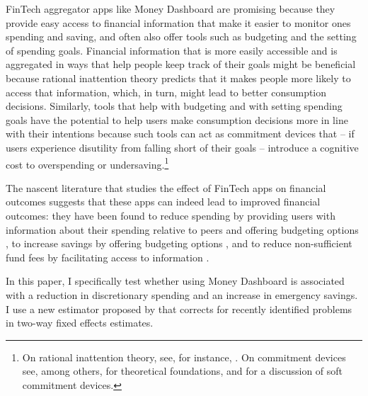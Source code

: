 FinTech aggregator apps like Money Dashboard are promising because they provide
easy access to financial information that make it easier to monitor ones
spending and saving, and often also offer tools such as budgeting and the
setting of spending goals. Financial information that
is more easily accessible and is aggregated in ways that help people keep track
of their goals might be beneficial because rational inattention theory predicts
that it makes people more likely to access that information, which, in turn,
might lead to better consumption decisions. Similarly, tools that help with
budgeting and with setting spending goals have the potential to help users make
consumption decisions more in line with their intentions because such tools can
act as commitment devices that -- if users experience disutility from falling
short of their goals -- introduce a cognitive cost to overspending or
undersaving.\footnote{On rational inattention theory, see, for instance,
    \citet{brunnermeier2008wealth, dellavigna2009psychology,
    sims2003implications}. On commitment devices see, among others,
    \citet{thaler1981economic, laibson1997golden, o1999doing} for theoretical
    foundations, and \citet{beshears2016beyond, hsiaw2013goal} for a discussion
of soft commitment devices.}

The nascent literature that studies the effect of FinTech apps on financial
outcomes suggests that these apps can indeed lead to improved financial
outcomes: they have been found to reduce spending by providing users with
information about their spending relative to peers
\citep{dacunto2020crowdsourcing} and offering budgeting options
\citep{lukas2022influence}, to increase savings by offering budgeting options
\citep{gargano2021goal}, and to reduce non-sufficient fund fees by facilitating
access to information \citep{carlin2022mobile}.

In this paper, I specifically test whether using Money Dashboard is associated
with a reduction in discretionary spending and an increase in emergency
savings. I use a new estimator proposed by \citet{callaway2021difference} that
corrects for recently identified problems in two-way fixed effects estimates.

